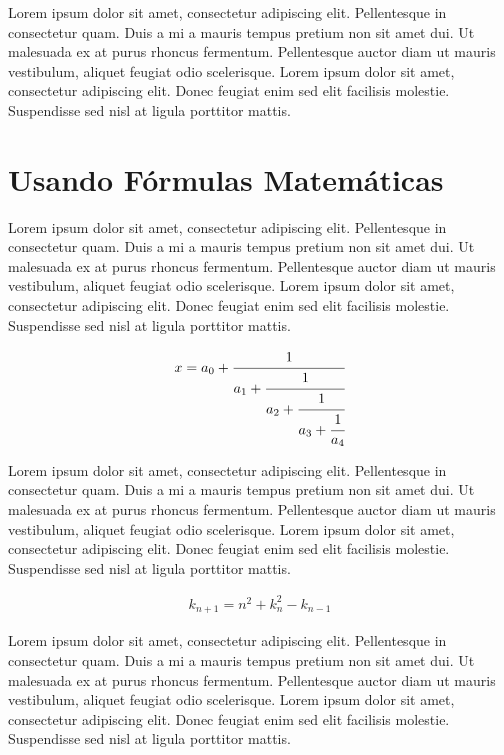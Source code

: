 Lorem ipsum dolor sit amet, consectetur adipiscing elit. Pellentesque in consectetur quam. Duis a mi a mauris tempus pretium non sit amet dui. Ut malesuada ex at purus rhoncus fermentum. Pellentesque auctor diam ut mauris vestibulum, aliquet feugiat odio scelerisque. Lorem ipsum dolor sit amet, consectetur adipiscing elit. Donec feugiat enim sed elit facilisis molestie. Suspendisse sed nisl at ligula porttitor mattis.

\section{Usando Fórmulas Matemáticas}

Lorem ipsum dolor sit amet, consectetur adipiscing elit. Pellentesque in consectetur quam. Duis a mi a mauris tempus pretium non sit amet dui. Ut malesuada ex at purus rhoncus fermentum. Pellentesque auctor diam ut mauris vestibulum, aliquet feugiat odio scelerisque. Lorem ipsum dolor sit amet, consectetur adipiscing elit. Donec feugiat enim sed elit facilisis molestie. Suspendisse sed nisl at ligula porttitor mattis.

	\begin{equation}
		\begin{aligned}
			x = a_0 + \cfrac{1}{a_1
				+ \cfrac{1}{a_2
					+ \cfrac{1}{a_3 + \cfrac{1}{a_4} } } }
		\end{aligned}
	\end{equation}

Lorem ipsum dolor sit amet, consectetur adipiscing elit. Pellentesque in consectetur quam. Duis a mi a mauris tempus pretium non sit amet dui. Ut malesuada ex at purus rhoncus fermentum. Pellentesque auctor diam ut mauris vestibulum, aliquet feugiat odio scelerisque. Lorem ipsum dolor sit amet, consectetur adipiscing elit. Donec feugiat enim sed elit facilisis molestie. Suspendisse sed nisl at ligula porttitor mattis.

	\begin{equation}
		\begin{aligned}
			k_{n+1} = n^2 + k_n^2 - k_{n-1}
		\end{aligned}
	\end{equation}

Lorem ipsum dolor sit amet, consectetur adipiscing elit. Pellentesque in consectetur quam. Duis a mi a mauris tempus pretium non sit amet dui. Ut malesuada ex at purus rhoncus fermentum. Pellentesque auctor diam ut mauris vestibulum, aliquet feugiat odio scelerisque. Lorem ipsum dolor sit amet, consectetur adipiscing elit. Donec feugiat enim sed elit facilisis molestie. Suspendisse sed nisl at ligula porttitor mattis.

